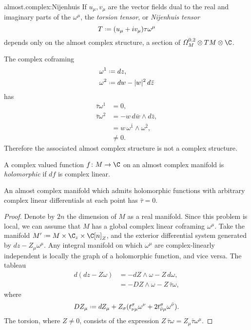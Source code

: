 \begin{answer}{almost.complex:Nijenhuis}
If \(u_{\mu},v_{\mu}\) are the vector fields dual to the real and imaginary parts of the \(\omega^{\mu}\), the \emph{torsion tensor}, or \emph{Nijenhuis tensor}
\[
T\defeq
(u_{\mu}+iv_{\mu})\tau\omega^{\mu}
\]
depends only on the almost complex structure, a section of \(\nForms{0,2}{M} \otimes TM \otimes \C\).
\end{answer}
\begin{example}
The complex coframing
\begin{align*}
\omega^1&\defeq dz,\\
\omega^2&\defeq dw-|w|^2 \, d\bar{z}
\end{align*}
has
\begin{align*}
\bar\tau\omega^1&=0,\\
\bar\tau\omega^2&=-w\, d\bar{w} \wedge d\bar{z},\\
&=w\,\omega^{\bar{1}}\wedge\omega^{\bar{2}},\\
&\ne0.
\end{align*}
Therefore the associated almost complex structure is not a complex structure.
\end{example}
A complex valued function \(f\colon M \to\C\) on an almost complex manifold is \emph{holomorphic} if \(df\) is complex linear.
\begin{lemma}
An almost complex manifold which admits holomorphic functions with arbitrary complex linear differentials at each point has \(\bar\tau=0\).
\end{lemma}
\begin{proof}
Denote by \(2n\) the dimension of \(M\) as a real manifold.
Since this problem is local, we can assume that \(M\) has a global complex linear coframing \(\omega^{\mu}\).
Take the manifold \(M'\defeq M \times \C_z \times \C[n]_{Z}\), and the exterior differential system generated by 
\(
dz-Z_{\mu}\omega^{\mu}.
\)
Any integral manifold on which \(\omega^{\mu}\) are complex-linearly independent is locally the graph of a holomorphic function, and vice versa.
The tableau
\begin{align*}
d(dz-Z\omega)
&=-dZ\wedge\omega-Z\,d\omega,
\\
&=
-DZ\wedge\omega-Z\, \bar\tau\omega,
\end{align*}
where
\[
DZ_{\mu}\defeq dZ_{\mu}+Z_{\sigma}(t^{\sigma}_{\nu\mu}\omega^{\nu}+2t^{\sigma}_{\bar{\nu}\mu}\omega^{\bar{\nu}}).
\]
The torsion, where \(Z\ne0\), consists of the expression \(Z\,\bar\tau\omega=Z_{\mu}\bar\tau\omega^{\mu}\).
\end{proof}
